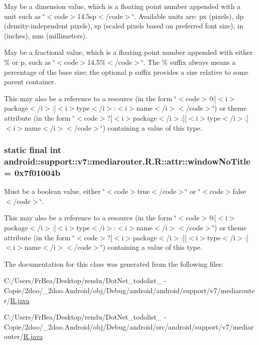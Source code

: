 May be a dimension value, which is a floating point number appended with a unit such as \char`\"{}$<$code$>$14.5sp$<$/code$>$\char`\"{}. Available units are: px (pixels), dp (density-independent pixels), sp (scaled pixels based on preferred font size), in (inches), mm (millimeters). 

May be a fractional value, which is a floating point number appended with either \% or p, such as \char`\"{}$<$code$>$14.5\%$<$/code$>$\char`\"{}. The \% suffix always means a percentage of the base size; the optional p suffix provides a size relative to some parent container. 

This may also be a reference to a resource (in the form \char`\"{}$<$code$>$@\mbox{[}$<$i$>$package$<$/i$>$:\mbox{]}$<$i$>$type$<$/i$>$:$<$i$>$name$<$/i$>$$<$/code$>$\char`\"{}) or theme attribute (in the form \char`\"{}$<$code$>$?\mbox{[}$<$i$>$package$<$/i$>$:\mbox{]}\mbox{[}$<$i$>$type$<$/i$>$:\mbox{]}$<$i$>$name$<$/i$>$$<$/code$>$\char`\"{}) containing a value of this type. \hypertarget{classandroid_1_1support_1_1v7_1_1mediarouter_1_1_r_1_1attr_73d604a440be1c4cc6e61d8f58998c53}{
\subsubsection[{windowNoTitle}]{\setlength{\rightskip}{0pt plus 5cm}static final int android::support::v7::mediarouter.R.R::attr::windowNoTitle = 0x7f01004b}}
\label{classandroid_1_1support_1_1v7_1_1mediarouter_1_1_r_1_1attr_73d604a440be1c4cc6e61d8f58998c53}


Must be a boolean value, either \char`\"{}$<$code$>$true$<$/code$>$\char`\"{} or \char`\"{}$<$code$>$false$<$/code$>$\char`\"{}. 

This may also be a reference to a resource (in the form \char`\"{}$<$code$>$@\mbox{[}$<$i$>$package$<$/i$>$:\mbox{]}$<$i$>$type$<$/i$>$:$<$i$>$name$<$/i$>$$<$/code$>$\char`\"{}) or theme attribute (in the form \char`\"{}$<$code$>$?\mbox{[}$<$i$>$package$<$/i$>$:\mbox{]}\mbox{[}$<$i$>$type$<$/i$>$:\mbox{]}$<$i$>$name$<$/i$>$$<$/code$>$\char`\"{}) containing a value of this type. 

The documentation for this class was generated from the following files:\begin{CompactItemize}
\item 
C:/Users/FrBea/Desktop/rendu/DotNet\_\-todolist\_ - Copie/2doo/\_\-2doo.Android/obj/Debug/android/android/support/v7/mediarouter/\hyperlink{android_2support_2v7_2mediarouter_2_r_8java}{R.java}\item 
C:/Users/FrBea/Desktop/rendu/DotNet\_\-todolist\_ - Copie/2doo/\_\-2doo.Android/obj/Debug/android/src/android/support/v7/mediarouter/\hyperlink{src_2android_2support_2v7_2mediarouter_2_r_8java}{R.java}\end{CompactItemize}
